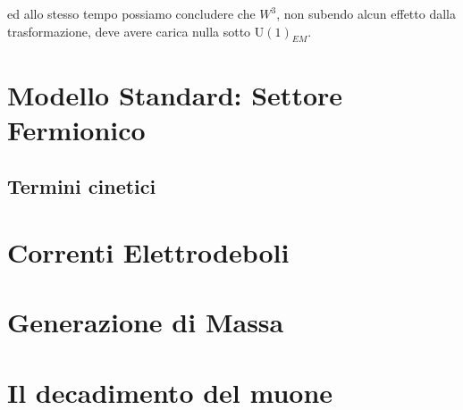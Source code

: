 \documentclass[../main.tex]{subfiles}
\begin{document}
ed allo stesso tempo possiamo concludere che $W^3$, non subendo alcun effetto dalla trasformazione, deve avere carica nulla sotto U$(1)_{EM}$. 

\section{Modello Standard: Settore Fermionico}
\subsection{Termini cinetici}

\section{Correnti Elettrodeboli}

\section{Generazione di Massa}

\section{Il decadimento del muone}
\end{document}
